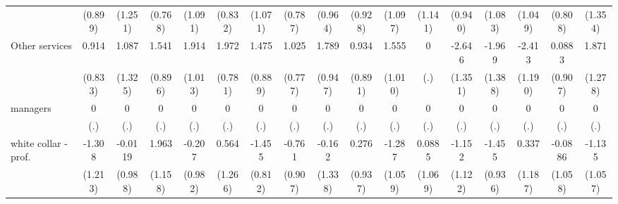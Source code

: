 {\begin{tabular}{l*{16}{c}}
                    &     (0.899)         &     (1.251)         &     (0.768)         &     (1.091)         &     (0.832)         &     (1.071)         &     (0.787)         &     (0.964)         &     (0.928)         &     (1.097)         &     (1.141)         &     (0.940)         &     (1.083)         &     (1.049)         &     (0.808)         &     (1.354)         \\
[1em]
Other services      &       0.914         &       1.087         &       1.541         &       1.914         &       1.972\sym{*}  &       1.475         &       1.025         &       1.789         &       0.934         &       1.555         &           0         &      -2.646         &      -1.969         &      -2.413\sym{*}  &      0.0883         &       1.871         \\
                    &     (0.833)         &     (1.325)         &     (0.896)         &     (1.013)         &     (0.781)         &     (0.889)         &     (0.777)         &     (0.947)         &     (0.891)         &     (1.010)         &         (.)         &     (1.351)         &     (1.388)         &     (1.190)         &     (0.907)         &     (1.278)         \\
[1em]
managers            &           0         &           0         &           0         &           0         &           0         &           0         &           0         &           0         &           0         &           0         &           0         &           0         &           0         &           0         &           0         &           0         \\
                    &         (.)         &         (.)         &         (.)         &         (.)         &         (.)         &         (.)         &         (.)         &         (.)         &         (.)         &         (.)         &         (.)         &         (.)         &         (.)         &         (.)         &         (.)         &         (.)         \\
[1em]
white collar - prof.&      -1.308         &     -0.0119         &       1.963         &      -0.207         &       0.564         &      -1.455         &      -0.761         &      -0.162         &       0.276         &      -1.287         &      0.0885         &      -1.152         &      -1.455         &       0.337         &     -0.0886         &      -1.135         \\
                    &     (1.213)         &     (0.988)         &     (1.158)         &     (0.982)         &     (1.266)         &     (0.812)         &     (0.907)         &     (1.338)         &     (0.937)         &     (1.059)         &     (1.069)         &     (1.122)         &     (0.936)         &     (1.187)         &     (1.058)         &     (1.057)         \\

\end{tabular}}
